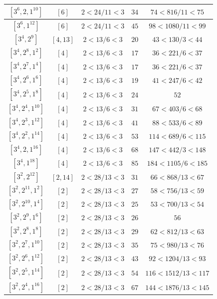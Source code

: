 \documentclass{article}%
\begin{document}
\begin{center}
\begin{longtable}{||c|c|c|c|c||}
$[3^{6}, 2, 1^{10}]$ & $[6]$ & $2 < 24/11 < 3$ & $34$ & $74 < 816/11 < 75$ \\ \hline 
$[3^{6}, 1^{12}]$ & $[6]$ & $2 < 24/11 < 3$ & $45$ & $98 < 1080/11 < 99$ \\ \hline 
$[3^{4}, 2^{9}]$ & $[4, 13]$ & $2 < 13/6 < 3$ & $20$ & $43 < 130/3 < 44$ \\ \hline 
$[3^{4}, 2^{8}, 1^{2}]$ & $[4]$ & $2 < 13/6 < 3$ & $17$ & $36 < 221/6 < 37$ \\ \hline 
$[3^{4}, 2^{7}, 1^{4}]$ & $[4]$ & $2 < 13/6 < 3$ & $17$ & $36 < 221/6 < 37$ \\ \hline 
$[3^{4}, 2^{6}, 1^{6}]$ & $[4]$ & $2 < 13/6 < 3$ & $19$ & $41 < 247/6 < 42$ \\ \hline 
$[3^{4}, 2^{5}, 1^{8}]$ & $[4]$ & $2 < 13/6 < 3$ & $24$ & $52$ \\ \hline 
$[3^{4}, 2^{4}, 1^{10}]$ & $[4]$ & $2 < 13/6 < 3$ & $31$ & $67 < 403/6 < 68$ \\ \hline 
$[3^{4}, 2^{3}, 1^{12}]$ & $[4]$ & $2 < 13/6 < 3$ & $41$ & $88 < 533/6 < 89$ \\ \hline 
$[3^{4}, 2^{2}, 1^{14}]$ & $[4]$ & $2 < 13/6 < 3$ & $53$ & $114 < 689/6 < 115$ \\ \hline 
$[3^{4}, 2, 1^{16}]$ & $[4]$ & $2 < 13/6 < 3$ & $68$ & $147 < 442/3 < 148$ \\ \hline 
$[3^{4}, 1^{18}]$ & $[4]$ & $2 < 13/6 < 3$ & $85$ & $184 < 1105/6 < 185$ \\ \hline 
$[3^{2}, 2^{12}]$ & $[2, 14]$ & $2 < 28/13 < 3$ & $31$ & $66 < 868/13 < 67$ \\ \hline 
$[3^{2}, 2^{11}, 1^{2}]$ & $[2]$ & $2 < 28/13 < 3$ & $27$ & $58 < 756/13 < 59$ \\ \hline 
$[3^{2}, 2^{10}, 1^{4}]$ & $[2]$ & $2 < 28/13 < 3$ & $25$ & $53 < 700/13 < 54$ \\ \hline 
$[3^{2}, 2^{9}, 1^{6}]$ & $[2]$ & $2 < 28/13 < 3$ & $26$ & $56$ \\ \hline 
$[3^{2}, 2^{8}, 1^{8}]$ & $[2]$ & $2 < 28/13 < 3$ & $29$ & $62 < 812/13 < 63$ \\ \hline 
$[3^{2}, 2^{7}, 1^{10}]$ & $[2]$ & $2 < 28/13 < 3$ & $35$ & $75 < 980/13 < 76$ \\ \hline 
$[3^{2}, 2^{6}, 1^{12}]$ & $[2]$ & $2 < 28/13 < 3$ & $43$ & $92 < 1204/13 < 93$ \\ \hline 
$[3^{2}, 2^{5}, 1^{14}]$ & $[2]$ & $2 < 28/13 < 3$ & $54$ & $116 < 1512/13 < 117$ \\ \hline 
$[3^{2}, 2^{4}, 1^{16}]$ & $[2]$ & $2 < 28/13 < 3$ & $67$ & $144 < 1876/13 < 145$ \\ \hline 

\end{longtable}
\end{center}
\end{document}

